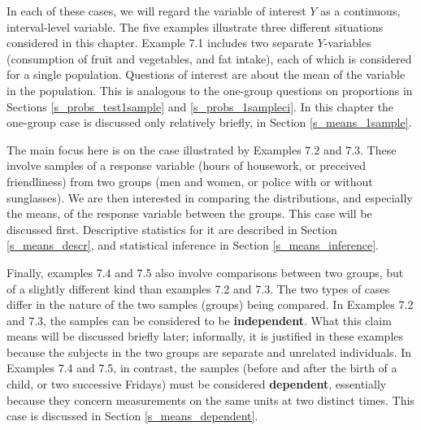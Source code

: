 In each of these cases, we will regard the variable of interest $Y$ as a
continuous, interval-level variable. The five examples illustrate three
different situations considered in this chapter. Example 7.1 includes
two separate $Y$-variables (consumption of fruit and vegetables, and fat
intake), each of which is considered for a single population.
Questions of interest are about the mean of the variable in the
population. This is analogous to the one-group questions on proportions
in Sections \ref{s_probs_test1sample} and \ref{s_probs_1sampleci}.
In this chapter the one-group case is
discussed only relatively briefly, in Section \ref{s_means_1sample}.

The main focus here is on the case illustrated by Examples 7.2 and 7.3.
These involve samples of a response variable (hours of housework, or
preceived friendliness) from two groups (men and women, or police with
or without sunglasses). We are then interested in comparing the
distributions, and especially the means, of the response variable
between the groups. This case will be discussed first. Descriptive
statistics for it are described in Section \ref{s_means_descr}, and statistical
inference in Section \ref{s_means_inference}.

Finally, examples 7.4 and 7.5 also involve comparisons between two
groups, but of a slightly different kind than examples 7.2 and 7.3. The
two types of cases differ in the nature of the two samples (groups)
being compared. \label{p_depsamples} In Examples 7.2 and 7.3, the
samples can be considered to be \textbf{independent}. What this claim
means will be discussed briefly later; informally, it is justified in
these examples because the subjects in the two groups are separate and
unrelated individuals. In Examples 7.4 and 7.5, in contrast, the samples
(before and after the birth of a child, or two successive Fridays) must
be considered \textbf{dependent}, essentially because they concern
measurements on the same units at two distinct times. This case is
discussed in Section \ref{s_means_dependent}.

